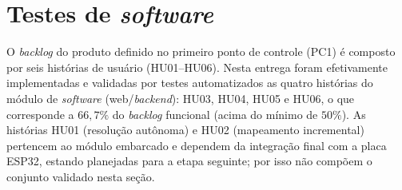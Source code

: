 \section{Testes de \textit{software}}
\label{sec:testes_software}

O \textit{backlog} do produto definido no primeiro ponto de controle (PC1) é composto por seis histórias
de usuário (HU01--HU06). Nesta entrega foram efetivamente implementadas e validadas
por testes automatizados as quatro histórias do módulo de \textit{software}
(web/\textit{backend}): HU03, HU04, HU05 e HU06, o que corresponde a $66{,}7\%$ do
\textit{backlog} funcional (acima do mínimo de $50\%$). As histórias HU01
(resolução autônoma) e HU02 (mapeamento incremental) pertencem ao módulo embarcado
e dependem da integração final com a placa ESP32, estando planejadas para a etapa
seguinte; por isso não compõem o conjunto validado nesta seção.


